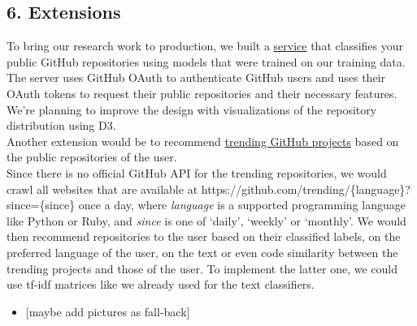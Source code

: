 \documentclass{article}
\providecommand{\tightlist}{%
  \setlength{\itemsep}{0pt}\setlength{\parskip}{0pt}}
\begin{document}
\subsection{6. Extensions}\label{extensions}

To bring our research work to production, we built a
\href{https://git-better.herokuapp.com/}{service} that classifies your
public GitHub repositories using models that were trained on our
training data. The server uses GitHub OAuth to authenticate GitHub users
and uses their OAuth tokens to request their public repositories and
their necessary features. We're planning to improve the design with
visualizations of the repository distribution using D3.\\
Another extension would be to recommend
\href{https://github.com/trending}{trending GitHub projects} based on
the public repositories of the user.\\
Since there is no official GitHub API for the trending repositories, we
would crawl all websites that are available at
https://github.com/trending/\{language\}?since=\{since\} once a day,
where \emph{language} is a supported programming language like Python or
Ruby, and \emph{since} is one of `daily', `weekly' or `monthly'. We
would then recommend repositories to the user based on their classified
labels, on the preferred language of the user, on the text or even code
similarity between the trending projects and those of the user. To
implement the latter one, we could use tf-idf matrices like we already
used for the text classifiers.

\begin{itemize}
\tightlist
\item
  {[}maybe add pictures as fall-back{]}
\end{itemize}
\end{document}
